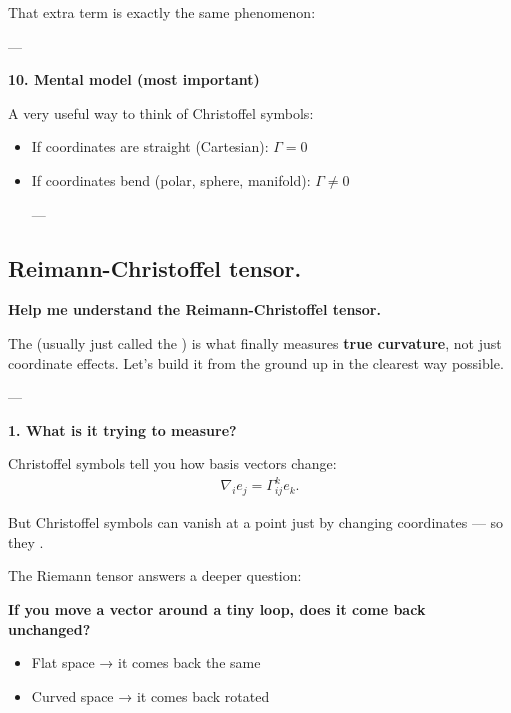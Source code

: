 \documentclass[12pt,a4paper]{report}
\begin{document}
\begin{description}
 That extra term is exactly the same phenomenon:


---

\item \textbf{ 10. Mental model (most important)}

A very useful way to think of Christoffel symbols:


\begin{itemize}
\item If coordinates are straight (Cartesian): $\Gamma = 0$
\item If coordinates bend (polar, sphere, manifold): $\Gamma \neq 0$

---
\end{itemize}

\HLINE
\newpage
\subsection*{Reimann-Christoffel tensor.}
\item \textbf{Help me understand the Reimann-Christoffel tensor.}

The  (usually just called the ) is what finally measures \textbf{true curvature}, not just coordinate effects. Let’s build it from the ground up in the clearest way possible.

---

\begin{description}

\item \textbf{1. What is it trying to measure?}

Christoffel symbols tell you how basis vectors change:
\begin{align*}
\nabla_i e_j = \Gamma^k_{ij} e_k.
\end{align*}

But Christoffel symbols can vanish at a point just by changing coordinates — so they .

The Riemann tensor answers a deeper question:

\textbf{ If you move a vector around a tiny loop, does it come back unchanged?}

\begin{itemize}
\item Flat space → it comes back the same
\item Curved space → it comes back rotated
\end{itemize}


\end{description}
\end{description}
\end{document}
